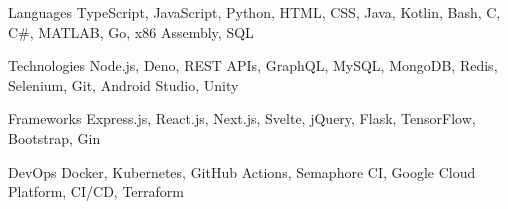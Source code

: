 

\begin{cvskills}

  \cvskill
    {Languages} %
    {TypeScript, JavaScript, Python, HTML, CSS, Java, Kotlin, Bash, C, C\#, MATLAB, Go, x86 Assembly, SQL } %

  \cvskill
    {Technologies} %
    {Node.js, Deno, REST APIs, GraphQL, MySQL, MongoDB, Redis, Selenium, Git, Android Studio, Unity} %

  \cvskill
    {Frameworks} %
    {Express.js, React.js, Next.js, Svelte, jQuery, Flask, TensorFlow, Bootstrap, Gin} %

  \cvskill
    {DevOps} %
    {Docker, Kubernetes, GitHub Actions, Semaphore CI, Google Cloud Platform, CI/CD, Terraform} %

\end{cvskills}
